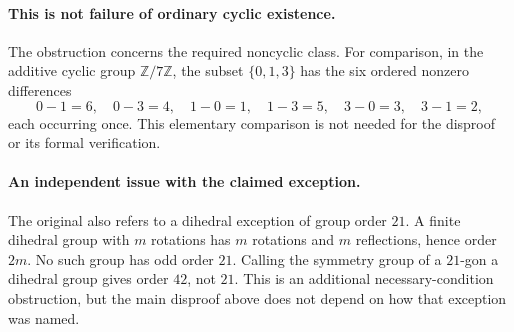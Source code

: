 \documentclass[11pt]{article}
\begin{document}
\paragraph{This is not failure of ordinary cyclic existence.}
The obstruction concerns the required noncyclic class. For comparison, in the additive cyclic group \(\mathbb Z/7\mathbb Z\), the subset \(\{0,1,3\}\) has the six ordered nonzero differences
\[
 0-1=6,\quad 0-3=4,\quad 1-0=1,\quad
 1-3=5,\quad 3-0=3,\quad 3-1=2,
\]
each occurring once. This elementary comparison is not needed for the disproof or its formal verification.
\newpage
\paragraph{An independent issue with the claimed exception.}
The original also refers to a dihedral exception of group order \(21\).
A finite dihedral group with \(m\) rotations has \(m\) rotations and \(m\) reflections, hence order \(2m\). No such group has odd order \(21\). Calling the symmetry group of a \(21\)-gon a dihedral group gives order \(42\), not \(21\). This is an additional necessary-condition obstruction, but the main disproof above does not depend on how that exception was named.
\end{document}
